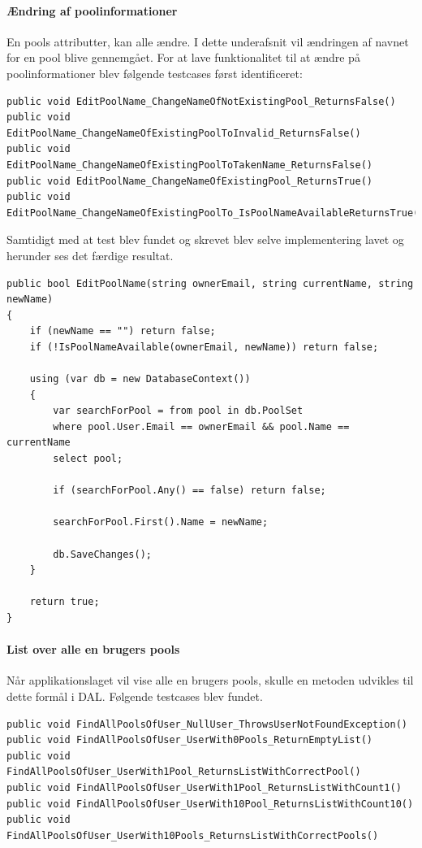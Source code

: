\paragraph{Ændring af poolinformationer}

En pools attributter, kan alle ændre. I dette underafsnit vil ændringen af navnet for en pool blive gennemgået. For at lave funktionalitet til at ændre på poolinformationer blev følgende testcases først identificeret:

\begin{lstlisting}
public void EditPoolName_ChangeNameOfNotExistingPool_ReturnsFalse()
public void EditPoolName_ChangeNameOfExistingPoolToInvalid_ReturnsFalse()
public void EditPoolName_ChangeNameOfExistingPoolToTakenName_ReturnsFalse()
public void EditPoolName_ChangeNameOfExistingPool_ReturnsTrue()
public void EditPoolName_ChangeNameOfExistingPoolTo_IsPoolNameAvailableReturnsTrue()                        
\end{lstlisting}

Samtidigt med at test blev fundet og skrevet blev selve implementering lavet og herunder ses det færdige resultat.

\begin{lstlisting}
public bool EditPoolName(string ownerEmail, string currentName, string newName)
{
	if (newName == "") return false;
	if (!IsPoolNameAvailable(ownerEmail, newName)) return false;
	
	using (var db = new DatabaseContext())
	{
		var searchForPool = from pool in db.PoolSet
		where pool.User.Email == ownerEmail && pool.Name == currentName
		select pool;
		
		if (searchForPool.Any() == false) return false;
		
		searchForPool.First().Name = newName;
		
		db.SaveChanges();
	}
	
	return true;
}
\end{lstlisting}

\paragraph{List over alle en brugers pools}

Når applikationslaget vil vise alle en brugers pools, skulle en metoden udvikles til dette formål i DAL. Følgende testcases blev fundet.

\begin{lstlisting}
public void FindAllPoolsOfUser_NullUser_ThrowsUserNotFoundException()
public void FindAllPoolsOfUser_UserWith0Pools_ReturnEmptyList()
public void FindAllPoolsOfUser_UserWith1Pool_ReturnsListWithCorrectPool()
public void FindAllPoolsOfUser_UserWith1Pool_ReturnsListWithCount1()
public void FindAllPoolsOfUser_UserWith10Pool_ReturnsListWithCount10()
public void FindAllPoolsOfUser_UserWith10Pools_ReturnsListWithCorrectPools()
\end{lstlisting}

